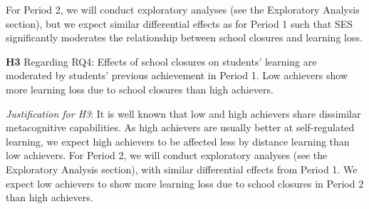 For Period 2, we will conduct exploratory analyses (see the Exploratory Analysis section), but we expect similar differential effects as for Period 1 such that SES significantly moderates the relationship between school closures and learning loss.

\textbf{H3} Regarding RQ4: Effects of school closures on students' learning are moderated by students' previous achievement in Period 1. Low achievers show more learning loss due to school closures than high achievers.

\textit{Justification for H3}: It is well known that low and high achievers share dissimilar metacognitive capabilities. As high achievers are usually better at self-regulated learning, we expect high achievers to be affected less by distance learning than low achievers. For Period 2, we will conduct exploratory analyses (see the Exploratory Analysis section), with similar differential effects from Period 1. We expect low achievers to show more learning loss due to school closures in Period 2 than high achievers.
